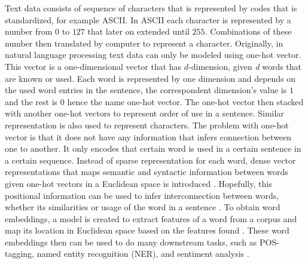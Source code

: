     Text data consists of sequence of characters that is represented
    by codes that is standardized, for example ASCII. In ASCII each
    character is represented by a number from $0$ to $127$ that later
    on extended until $255$. Combinations of these number then
    translated by computer to represent a character. Originally, in
    natural language processing text data can only be modeled using
    one-hot vector. This vector is a one-dimensional vector that has
    $d$-dimension, given \textit{d} words that are known or used. Each
    word is represented by one dimension and depends on the used word
    entries in the sentence, the correspondent dimension's value is
    $1$ and the rest is $0$ hence the name one-hot vector. The one-hot
    vector then stacked with another one-hot vectors to represent
    order of use in a sentence. Similar representation is also used to
    represent characters. The problem with one-hot vector is that it
    does not have any information that infers connection between one
    to another. It only encodes that certain word is used in a certain
    sentence in a certain sequence. Instead of sparse representation
    for each word, dense vector representations that maps semantic and
    syntactic information between words given one-hot vectors in a
    Euclidean space is introduced \citep{wordembedding2017yang,
    Distributed2013mikolov}. Hopefully, this positional information
    can be used to infer interconnection between words, whether its
    similarities or usage of the word in a sentence
    \citep{distributional1954harris}. To obtain word embeddings, a
    model is created to extract features of a word from a corpus and
    map its location in Euclidean space based on the features found
    \citep{Distributed2013mikolov, polyglot2013alrfou,
    dict2vect2017tissier}. These word embeddings then can be used to
    do many downstream tasks, such as POS-tagging, named entity
    recognition (NER), and sentiment analysis \citep{finding2015ling,
    neural2016lample}. 

